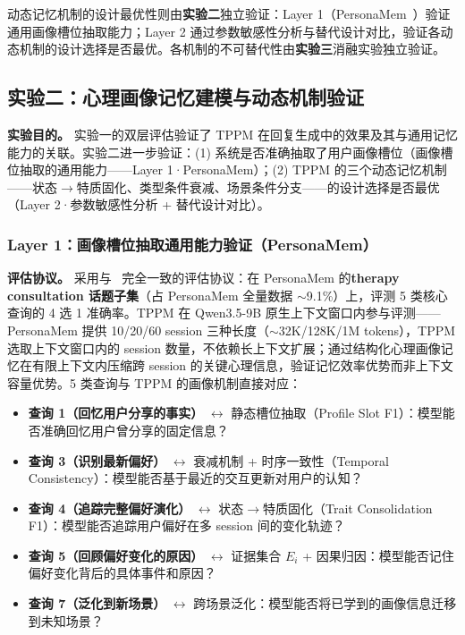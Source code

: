 \documentclass[12pt,a4paper]{article}
\begin{document}
动态记忆机制的设计最优性则由\textbf{实验二}独立验证：Layer 1（PersonaMem~\cite{jiang2025personamem}）验证通用画像槽位抽取能力；Layer 2 通过参数敏感性分析与替代设计对比，验证各动态机制的设计选择是否最优。各机制的不可替代性由\textbf{实验三}消融实验独立验证。

\subsection{实验二：心理画像记忆建模与动态机制验证}
\label{sec:exp2}

\textbf{实验目的。} 实验一的双层评估验证了 TPPM 在回复生成中的效果及其与通用记忆能力的关联。实验二进一步验证：(1) 系统是否准确抽取了用户画像槽位（画像槽位抽取的通用能力——Layer 1·PersonaMem）；(2) TPPM 的三个动态记忆机制——状态$\to$特质固化、类型条件衰减、场景条件分支——的设计选择是否最优（Layer 2·参数敏感性分析 + 替代设计对比）。

\subsubsection{Layer 1：画像槽位抽取通用能力验证（PersonaMem）}

\textbf{评估协议。}
采用与~\cite{jiang2025personamem} 完全一致的评估协议：在 PersonaMem 的\textbf{therapy consultation 话题子集}（占 PersonaMem 全量数据 $\sim$9.1\%）上，评测 5 类核心查询的 4 选 1 准确率。TPPM 在 Qwen3.5-9B 原生上下文窗口内参与评测——PersonaMem 提供 10/20/60 session 三种长度（$\sim$32K/128K/1M tokens），TPPM 选取上下文窗口内的 session 数量，不依赖长上下文扩展；通过结构化心理画像记忆在有限上下文内压缩跨 session 的关键心理信息，验证记忆效率优势而非上下文容量优势。5 类查询与 TPPM 的画像机制直接对应：

\begin{itemize}
  \item \textbf{查询 1（回忆用户分享的事实）} $\leftrightarrow$ 静态槽位抽取（Profile Slot F1）：模型能否准确回忆用户曾分享的固定信息？
  \item \textbf{查询 3（识别最新偏好）} $\leftrightarrow$ 衰减机制 + 时序一致性（Temporal Consistency）：模型能否基于最近的交互更新对用户的认知？
  \item \textbf{查询 4（追踪完整偏好演化）} $\leftrightarrow$ 状态$\to$特质固化（Trait Consolidation F1）：模型能否追踪用户偏好在多 session 间的变化轨迹？
  \item \textbf{查询 5（回顾偏好变化的原因）} $\leftrightarrow$ 证据集合 $E_i$ + 因果归因：模型能否记住偏好变化背后的具体事件和原因？
  \item \textbf{查询 7（泛化到新场景）} $\leftrightarrow$ 跨场景泛化：模型能否将已学到的画像信息迁移到未知场景？
\end{itemize}
\end{document}
